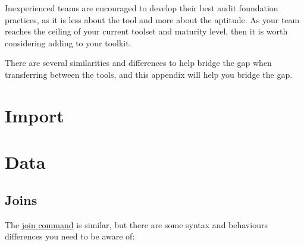 \documentclass[
]{book}
\begin{document}
Inexperienced teams are encouraged to develop their best audit foundation practices, as it is less about the tool and more about the aptitude. As your team reaches the ceiling of your current toolset and maturity level, then it is worth considering adding to your toolkit.

There are several similarities and differences to help bridge the gap when transferring between the tools, and this appendix will help you bridge the gap.

\hypertarget{import}{%
\section{Import}\label{import}}

\hypertarget{data}{%
\section{Data}\label{data}}

\hypertarget{joins}{%
\subsection{Joins}\label{joins}}

The \href{https://help.highbond.com/helpdocs/analytics/142/scripting-guide/en-us/Content/lang_ref/commands/r_join.htm}{join command} is similar, but there are some syntax and behaviours differences you need to be aware of:
\end{document}
